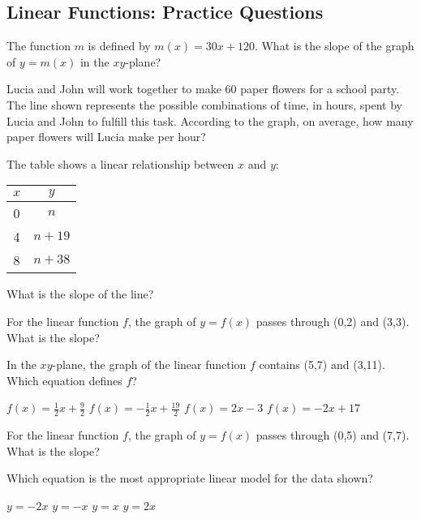 \documentclass[12pt]{exam}
\begin{document}
\subsection*{Linear Functions: Practice Questions}

\begin{questions}
\question The function $m$ is defined by $m(x) = 30x + 120$. What is the slope of the graph of $y = m(x)$ in the $xy$-plane?

\question Lucia and John will work together to make 60 paper flowers for a school party. The line shown represents the possible combinations of time, in hours, spent by Lucia and John to fulfill this task. According to the graph, on average, how many paper flowers will Lucia make per hour?
\begin{choices}
\end{choices}

\question The table shows a linear relationship between $x$ and $y$:
\begin{center}
\begin{tabular}{|c|c|}
\hline
$x$ & $y$ \\
\hline
0 & $n$ \\
4 & $n + 19$ \\
8 & $n + 38$ \\
\hline
\end{tabular}
\end{center}
What is the slope of the line?

\question For the linear function $f$, the graph of $y = f(x)$ passes through (0,2) and (3,3). What is the slope?

\question In the $xy$-plane, the graph of the linear function $f$ contains (5,7) and (3,11). Which equation defines $f$?
\begin{choices}
\choice $f(x) = \frac{1}{2}x + \frac{9}{2}$
\choice $f(x) = -\frac{1}{2}x + \frac{19}{2}$
\choice $f(x) = 2x - 3$
\choice $f(x) = -2x + 17$
\end{choices}

\question For the linear function $f$, the graph of $y = f(x)$ passes through (0,5) and (7,7). What is the slope?

\question Which equation is the most appropriate linear model for the data shown?
\begin{choices}
\choice $y = -2x$
\choice $y = -x$
\choice $y = x$
\choice $y = 2x$
\end{choices}


\end{questions}
\end{document}

